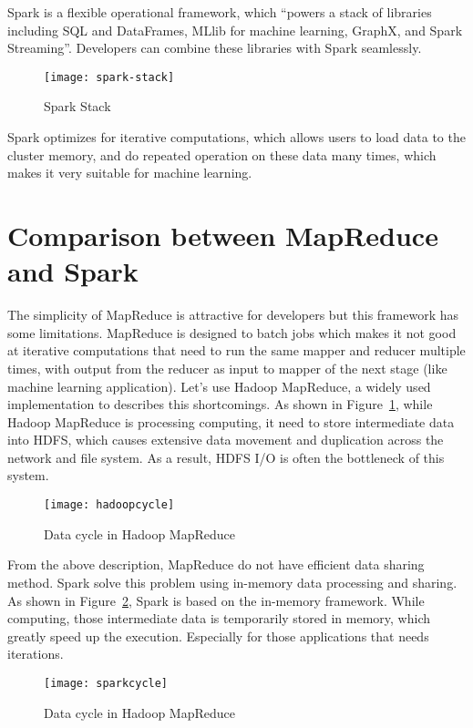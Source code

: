 Spark is a flexible operational framework, which ``powers a stack of libraries including SQL and DataFrames, MLlib for machine learning, GraphX, and Spark Streaming''\cite{apache_spark}. Developers can combine these libraries with Spark seamlessly.
\begin{figure}[h]
	\centering
	\texttt{[image: spark-stack]}
	\caption{Spark Stack}
\end{figure}


Spark optimizes for iterative computations, which allows users to load data to the cluster memory, and do repeated operation on these data many times, which makes it very suitable for machine learning\cite{meng2016mllib}.

\section{Comparison between MapReduce and Spark}
The simplicity of MapReduce is attractive for developers but this framework has some limitations. MapReduce is designed to batch jobs which makes it not good at iterative computations that need to run the same mapper and reducer multiple times, with output from the reducer as input to mapper of the next stage (like machine learning application)\cite{shi2015clash}. Let's use Hadoop MapReduce, a widely used implementation to describes this shortcomings. As shown in Figure~\ref{fg:hadoop}, while Hadoop MapReduce is processing computing, it need to store intermediate data into HDFS, which causes extensive data movement and duplication across the network and file system. As a result, HDFS I/O is often the bottleneck of this system.

\begin{figure}[h]
	\centering
	\texttt{[image: hadoopcycle]}
	\caption{Data cycle in Hadoop MapReduce}
	\label{fg:hadoop}
\end{figure}

From the above description, MapReduce do not have efficient data sharing method. Spark solve this problem using in-memory data processing and sharing\cite{apache_spark}. As shown in Figure~\ref{fg:spark}, Spark is based on the in-memory framework. While computing, those intermediate data is temporarily stored in memory, which greatly speed up the execution. Especially for those applications that needs iterations.

\begin{figure}[h]
	\centering
	\texttt{[image: sparkcycle]}
	\caption{Data cycle in Hadoop MapReduce}
	\label{fg:spark}
\end{figure}

